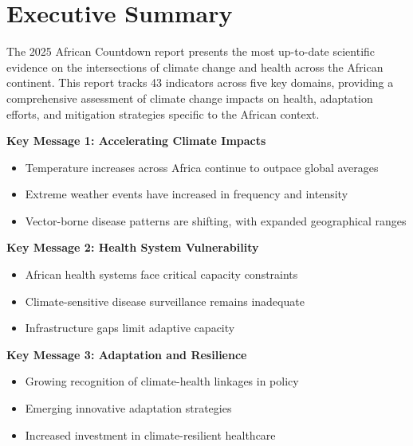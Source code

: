 \section*{Executive Summary}

The 2025 African Countdown report presents the most up-to-date scientific evidence on the intersections of climate change and health across the African continent. This report tracks 43 indicators across five key domains, providing a comprehensive assessment of climate change impacts on health, adaptation efforts, and mitigation strategies specific to the African context.

\begin{keymessage}
    \textbf{Key Message 1: Accelerating Climate Impacts}
    \begin{itemize}
        \item Temperature increases across Africa continue to outpace global averages
        \item Extreme weather events have increased in frequency and intensity
        \item Vector-borne disease patterns are shifting, with expanded geographical ranges
    \end{itemize}
\end{keymessage}

\begin{keymessage}
    \textbf{Key Message 2: Health System Vulnerability}
    \begin{itemize}
        \item African health systems face critical capacity constraints
        \item Climate-sensitive disease surveillance remains inadequate
        \item Infrastructure gaps limit adaptive capacity
    \end{itemize}
\end{keymessage}

\begin{keymessage}
    \textbf{Key Message 3: Adaptation and Resilience}
    \begin{itemize}
        \item Growing recognition of climate-health linkages in policy
        \item Emerging innovative adaptation strategies
        \item Increased investment in climate-resilient healthcare
    \end{itemize}
\end{keymessage}

